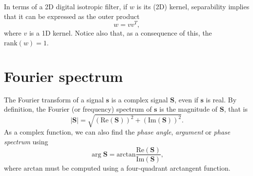\documentclass{article}
\begin{document}
In terms of a 2D digital isotropic filter, if $w$ is its (2D) kernel,
separability implies that it can be expressed as the outer product
\cite{gonzalez1992digital}
\begin{equation}
  w = vv^T,
\end{equation}
where $v$ is a 1D kernel. Notice also that, as a consequence of this,
the $\text{rank}(w)=1$.

\section{Fourier spectrum}

The Fourier transform of a signal $\mathbf{s}$ is a complex signal
$\mathbf{S}$, even if $\mathbf{s}$ is real. By definition, the Fourier
(or frequency) spectrum of $\mathbf{s}$ is the magnitude of
$\mathbf{S}$, that is
\begin{equation}
  |\mathbf{S}| = \sqrt{(\text{Re}(\mathbf{S}))^2+(\text{Im}(\mathbf{S}))^2}.
\end{equation}
As a complex function, we can also find the \emph{phase angle}, \emph{argument} or
\emph{phase spectrum} using
\begin{equation}
  \arg{\mathbf{S}} = \text{arctan}\frac{\text{Re}(\mathbf{S})}{\text{Im}(\mathbf{S})},
\end{equation}
where $\text{arctan}$ must be computed using a four-quadrant
arctangent function.
\end{document}
